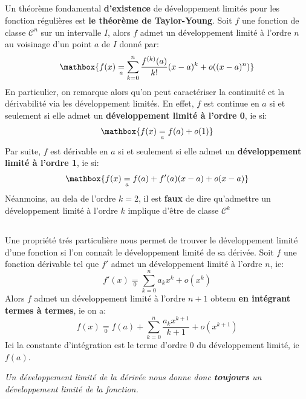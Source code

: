 \subsection*{}

Un théorème fondamental \textbf{d'existence} de développement limités pour les fonction régulières est \textbf{le théorème de Taylor-Young}.\+
Soit \(f\) une fonction de classe \(\mathscr{C}^n\) sur un intervalle \(I\), alors \(f\) admet un développement limité à l'ordre \(n\) au voisinage d'un point \(a\) de \(I\) donné par:
\[
   \mathbox{f(x) \underset{a}{=} \sum_{k=0}^{n} \frac{f^{(k)}(a)}{k!}(x - a)^k + o((x - a)^n)}   
\]
En particulier, on remarque alors qu'on peut caractériser la continuité et la dérivabilité via les développement limités.\+
En effet, \(f\) est continue en \(a\) si et seulement si elle admet un \textbf{développement limité à l'ordre 0}, ie si:
\[
   \mathbox{f(x) \underset{a}{=} f(a) + o(1)}
\]
Par suite, \(f\) est dérivable en \(a\) si et seulement si elle admet un \textbf{développement limité à l'ordre 1}, ie si:
\[
   \mathbox{f(x) \underset{a}{=} f(a) + f'(a)(x - a) + o(x - a)}
\]
Néanmoins, au dela de l'ordre \(k = 2\), il est \textbf{faux} de dire qu'admettre un développement limité à l'ordre \(k\) implique d'être de classe \(\mathscr{C}^k\)

\subsection*{}

Une propriété trés particulière nous permet de trouver le développement limité d'une fonction si l'on connaît le développement limité de sa dérivée.\+ 
Soit \(f\) une fonction dérivable tel que \(f'\) admet un développement limité à l'ordre \(n\), ie:
\[
   f'(x) \underset{0}{=} \sum_{k=0}^{n} a_kx^k + o(x^k)   
\]
Alors \(f\) admet un développement limité à l'ordre \(n + 1\) obtenu \textbf{en intégrant termes à termes}, ie on a:
\[
   f(x) \underset{0}{=} f(a) + \sum_{k=0}^{n} \frac{a_k x^{k+1}}{k+1} + o(x^{k+1})   
\]
Ici la constante d'intégration est le terme d'ordre 0 du développement limité, ie \(f(a)\).
\begin{center}
   \textit{
      Un développement limité de la dérivée nous donne donc \textbf{toujours}\+
      un développement limité de la fonction.
   }
\end{center}

